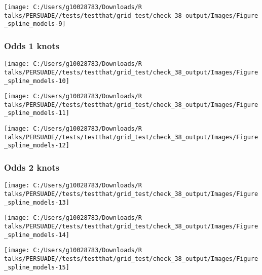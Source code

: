\documentclass[
]{article}
\begin{document}
\begin{flushleft}\texttt{[image: C:/Users/g10028783/Downloads/R talks/PERSUADE//tests/testthat/grid\_test/check\_38\_output/Images/Figure\_spline\_models-9]} \end{flushleft}

\clearpage

\subsubsection{Odds 1 knots}\label{odds-1-knots}

\begin{flushleft}\texttt{[image: C:/Users/g10028783/Downloads/R talks/PERSUADE//tests/testthat/grid\_test/check\_38\_output/Images/Figure\_spline\_models-10]} \end{flushleft}

\begin{flushleft}\texttt{[image: C:/Users/g10028783/Downloads/R talks/PERSUADE//tests/testthat/grid\_test/check\_38\_output/Images/Figure\_spline\_models-11]} \end{flushleft}

\begin{flushleft}\texttt{[image: C:/Users/g10028783/Downloads/R talks/PERSUADE//tests/testthat/grid\_test/check\_38\_output/Images/Figure\_spline\_models-12]} \end{flushleft}

\clearpage

\subsubsection{Odds 2 knots}\label{odds-2-knots}

\begin{flushleft}\texttt{[image: C:/Users/g10028783/Downloads/R talks/PERSUADE//tests/testthat/grid\_test/check\_38\_output/Images/Figure\_spline\_models-13]} \end{flushleft}

\begin{flushleft}\texttt{[image: C:/Users/g10028783/Downloads/R talks/PERSUADE//tests/testthat/grid\_test/check\_38\_output/Images/Figure\_spline\_models-14]} \end{flushleft}

\begin{flushleft}\texttt{[image: C:/Users/g10028783/Downloads/R talks/PERSUADE//tests/testthat/grid\_test/check\_38\_output/Images/Figure\_spline\_models-15]} \end{flushleft}
\end{document}
